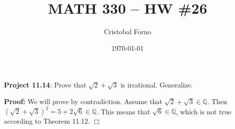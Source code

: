 \documentclass[12pt]{article}
\title{MATH 330 -- HW \#26}
\author{Cristobal Forno}
\date{\today}
\begin{document}
\maketitle

\textbf{Project 11.14}: Prove that $\sqrt{2} + \sqrt{3}$ is irrational.
Generalize.


\textbf{Proof:}
We will prove by contradiction. Assume that $\sqrt{2} + \sqrt{3} \in
\mathbb{Q}$. Then  $(\sqrt{2} + \sqrt{3})^2 = 5 + 2\sqrt{6} \in \mathbb{Q}$.
This means that $\sqrt{6} \in \mathbb{Q}$, which is not true according to
Theorem 11.12. $\Box$
\end{document}
